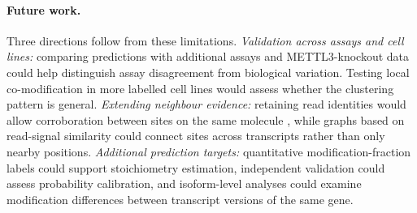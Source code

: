 \documentclass[11pt,a4paper]{article}
\begin{document}
\paragraph{Future work.}
Three directions follow from these limitations.
\emph{Validation across assays and cell lines:} comparing predictions with
additional assays and METTL3-knockout data could help distinguish assay
disagreement from biological variation. Testing local co-modification in
more labelled cell lines would assess whether the clustering pattern is
general. \emph{Extending neighbour evidence:} retaining read identities
would allow corroboration between sites on the same molecule
\citep{kang2025,m6aiso2025}, while graphs based on read-signal similarity
could connect sites across transcripts rather than only nearby positions.
\emph{Additional prediction targets:} quantitative modification-fraction
labels could support stoichiometry estimation, independent validation could
assess probability calibration, and isoform-level analyses could examine
modification differences between transcript versions of the same gene.

\clearpage
\renewcommand{\thepage}{S\arabic{page}}
\end{document}
